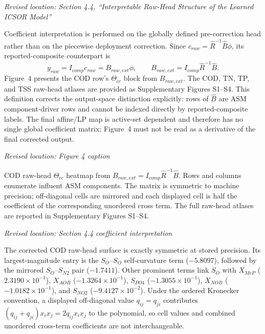 \documentclass[11pt,a4paper]{article}
\newcommand{\excerptlocation}[1]{\par\noindent\textit{Revised location: #1}\par}
\begin{document}
\excerptlocation{Section 4.4, ``Interpretable Raw-Head Structure of the Learned ICSOR Model''}
\begin{revisionexcerpt}
Coefficient interpretation is performed on the globally defined pre-correction head rather than on the piecewise deployment correction. Since $c_{raw}=\widehat{R}^{-1}\widehat{B}\phi$, its reported-composite counterpart is
\begin{equation*}
y_{raw}=I_{comp}c_{raw}=B_{raw,ext}\phi,
\qquad
B_{raw,ext}=I_{comp}\widehat{R}^{-1}\widehat{B}.
\end{equation*}
Figure~4 presents the COD row's $\Theta_{cc}$ block from $B_{raw,ext}$. The COD, TN, TP, and TSS raw-head atlases are provided as Supplementary Figures S1--S4. This definition corrects the output-space distinction explicitly: rows of $\widehat{B}$ are ASM component-driver rows and cannot be indexed directly by reported-composite labels. The final affine/LP map is active-set dependent and therefore has no single global coefficient matrix; Figure~4 must not be read as a derivative of the final corrected output.
\end{revisionexcerpt}

\excerptlocation{Figure 4 caption}
\begin{revisionexcerpt}
COD raw-head $\Theta_{cc}$ heatmap from $B_{raw,ext}=I_{comp}\widehat{R}^{-1}\widehat{B}$. Rows and columns enumerate influent ASM components. The matrix is symmetric to machine precision; off-diagonal cells are mirrored and each displayed cell is half the coefficient of the corresponding unordered cross term. The full raw-head atlases are reported in Supplementary Figures S1--S4.
\end{revisionexcerpt}

\excerptlocation{Section 4.4 coefficient interpretation}
\begin{revisionexcerpt}
The corrected COD raw-head surface is exactly symmetric at stored precision. Its largest-magnitude entry is the $S_O$--$S_O$ self-curvature term ($-5.8097$), followed by the mirrored $S_O$--$S_{N2}$ pair ($-1.7411$). Other prominent terms link $S_O$ with $X_{MeP}$ ($2.3190\times10^{-1}$), $X_{AOB}$ ($-1.3264\times10^{-1}$), $S_{PO4}$ ($-1.3055\times10^{-1}$), $X_{NOB}$ ($-1.0182\times10^{-1}$), and $S_{NO2}$ ($-9.4127\times10^{-2}$). Under the ordered Kronecker convention, a displayed off-diagonal value $q_{ij}=q_{ji}$ contributes $(q_{ij}+q_{ji})x_ix_j=2q_{ij}x_ix_j$ to the polynomial, so cell values and combined unordered cross-term coefficients are not interchangeable.
\end{revisionexcerpt}
\end{document}
